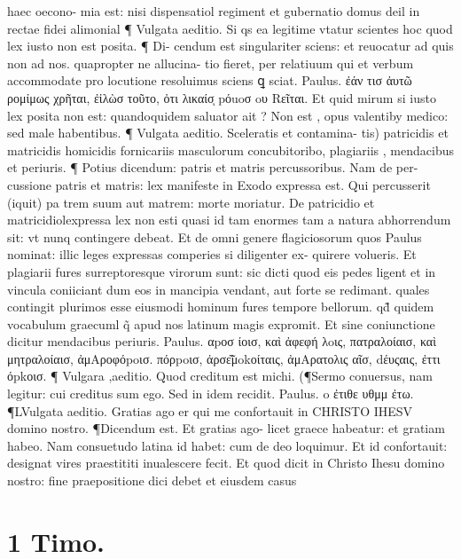 \documentclass{article}
\begin{document}
\begin{pages}
haec oecono- mia est: nisi dispensatiol regiment et gubernatio domus deil in rectae fidei alimonial ¶ Vulgata aeditio. Si qs ea legitime vtatur scientes hoc quod lex iusto non est posita. ¶ Di- cendum est singulariter sciens: et reuocatur ad quis non ad nos. quapropter ne allucina- tio fieret, per relatiuum qui et verbum accommodate pro locutione resoluimus sciens ꝗ sciat. Paulus. ἐάν τισ ἀυτῶ ρομίμως χρῆται, ἐἰλὼσ τοῦτο, ὀτι λικαίσͅ pόuoσ oυ Rεῖται. Et quid mirum si iusto lex posita non est: quandoquidem saluator ait ? Non est , opus valentiby medico: sed male habentibus. ¶ Vulgata aeditio. Sceleratis et contamina-  tis) patricidis et matricidis homicidis fornicariis masculorum concubitoribo, plagiariis  , mendacibus et periuris. ¶ Potius dicendum: patris et matris percussoribus. Nam de per- cussione patris et matris: lex manifeste in Exodo expressa est. Qui percusserit (iquit) pa trem suum aut matrem: morte moriatur. De patricidio et matricidiolexpressa lex non esti quasi id tam enormes tam a natura abhorrendum sit: vt nunq contingere debeat. Et de omni genere flagiciosorum quos Paulus nominat: illic leges expressas comperies si diligenter ex- quirere volueris. Et plagiarii fures surreptoresque virorum sunt: sic dicti quod eis pedes ligent et in vincula coniiciant dum eos in mancipia vendant, aut forte se redimant. quales contingit plurimos esse eiusmodi hominum fures tempore bellorum. qd̃ quidem vocabulum graecuml q̃ apud nos latinum magis expromit. Et sine coniunctione dicitur mendacibus periuris. Paulus. αpοσ ίοισ, καὶ ἀφεφή λoις, πατραλοίαισ, καὶ μητραλοίαισ, ἀμAροφόpoισ. πόρpoισ, ἀρσε̃͂μokοίταις, ἀμAρατολις αῖσ, dέυςαις, ἐττι όpkοισ. ¶ Vulgara ,aeditio. Quod creditum est michi. (¶Sermo conuersus, nam legitur: cui creditus sum ego. Sed in idem recidit. Paulus. o ἐτιθε υθμμ ἐτω. ¶LVulgata aeditio. Gratias ago er qui me confortauit in CHRISTO IHESV domino nostro. ¶Dicendum est. Et gratias ago- licet graece habeatur: et gratiam habeo. Nam consuetudo latina id habet: cum de deo loquimur. Et id confortauit: designat vires praestititi inualescere fecit. Et quod dicit in Christo Ihesu domino nostro: fine praepositione dici debet et eiusdem casus  \pend
\section*{1 Timo. }

\end{pages}
\end{document}
